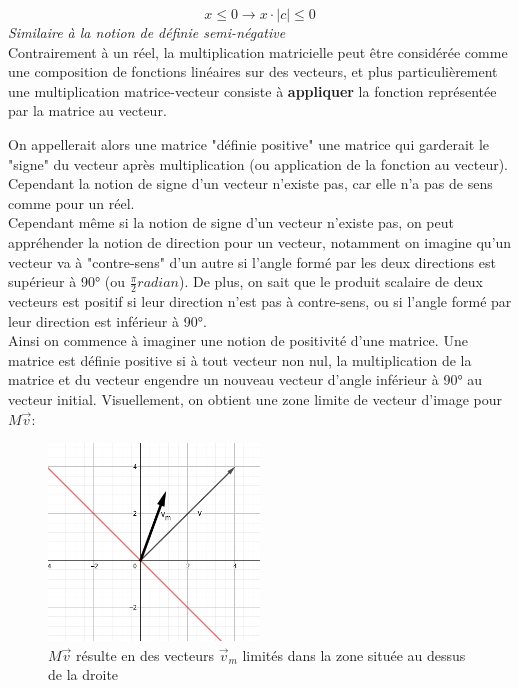 \documentclass[french]{article}
\begin{document}
\[
x \leq 0 \rightarrow x \cdot \left|c\right| \leq 0
\]
\textit{Similaire à la notion de définie semi-négative}\\

Contrairement à un réel, la multiplication matricielle peut être considérée comme une composition de fonctions linéaires sur des vecteurs, et plus particulièrement une multiplication matrice-vecteur consiste à \textbf{appliquer} la fonction représentée par la matrice au vecteur.

On appellerait alors une matrice "définie positive" une matrice qui garderait le "signe" du vecteur après multiplication (ou application de la fonction au vecteur). Cependant la notion de signe d'un vecteur n'existe pas, car elle n'a pas de sens comme pour un réel.\\

Cependant même si la notion de signe d'un vecteur n'existe pas, on peut appréhender la notion de direction pour un vecteur, notamment on imagine qu'un vecteur va à "contre-sens" d'un autre si l'angle formé par les deux directions est supérieur à 90° (ou $\frac{\pi}{2} radian$). De plus, on sait que le produit scalaire de deux vecteurs est positif si leur direction n'est pas à contre-sens, ou si l'angle formé par leur direction est inférieur à 90°.\\

Ainsi on commence à imaginer une notion de positivité d'une matrice. Une matrice est définie positive si à tout vecteur non nul, la multiplication de la matrice et du vecteur engendre un nouveau vecteur d'angle inférieur à 90° au vecteur initial. Visuellement, on obtient une zone limite de vecteur d'image pour $M\vec v$:

\begin{figure}[h]
	\centering
	\includegraphics[width=0.5\textwidth]{defpos}
	\caption{$M\vec{v}$ résulte en des vecteurs $\vec v_m$ limités dans la zone située au dessus de la droite}
	\label{fig:mesh1}
\end{figure}
\end{document}
